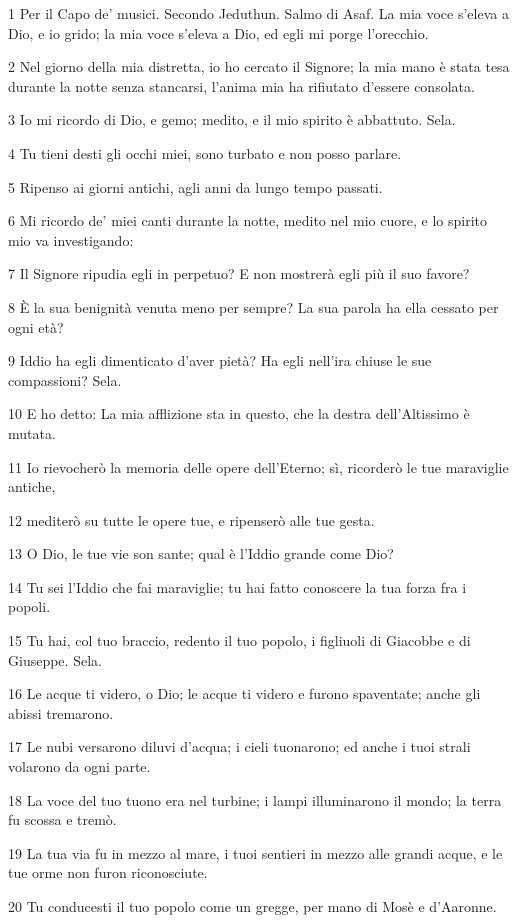 \par 1 Per il Capo de' musici. Secondo Jeduthun. Salmo di Asaf. La mia voce s'eleva a Dio, e io grido; la mia voce s'eleva a Dio, ed egli mi porge l'orecchio.
\par 2 Nel giorno della mia distretta, io ho cercato il Signore; la mia mano è stata tesa durante la notte senza stancarsi, l'anima mia ha rifiutato d'essere consolata.
\par 3 Io mi ricordo di Dio, e gemo; medito, e il mio spirito è abbattuto. Sela.
\par 4 Tu tieni desti gli occhi miei, sono turbato e non posso parlare.
\par 5 Ripenso ai giorni antichi, agli anni da lungo tempo passati.
\par 6 Mi ricordo de' miei canti durante la notte, medito nel mio cuore, e lo spirito mio va investigando:
\par 7 Il Signore ripudia egli in perpetuo? E non mostrerà egli più il suo favore?
\par 8 È la sua benignità venuta meno per sempre? La sua parola ha ella cessato per ogni età?
\par 9 Iddio ha egli dimenticato d'aver pietà? Ha egli nell'ira chiuse le sue compassioni? Sela.
\par 10 E ho detto: La mia afflizione sta in questo, che la destra dell'Altissimo è mutata.
\par 11 Io rievocherò la memoria delle opere dell'Eterno; sì, ricorderò le tue maraviglie antiche,
\par 12 mediterò su tutte le opere tue, e ripenserò alle tue gesta.
\par 13 O Dio, le tue vie son sante; qual è l'Iddio grande come Dio?
\par 14 Tu sei l'Iddio che fai maraviglie; tu hai fatto conoscere la tua forza fra i popoli.
\par 15 Tu hai, col tuo braccio, redento il tuo popolo, i figliuoli di Giacobbe e di Giuseppe. Sela.
\par 16 Le acque ti videro, o Dio; le acque ti videro e furono spaventate; anche gli abissi tremarono.
\par 17 Le nubi versarono diluvi d'acqua; i cieli tuonarono; ed anche i tuoi strali volarono da ogni parte.
\par 18 La voce del tuo tuono era nel turbine; i lampi illuminarono il mondo; la terra fu scossa e tremò.
\par 19 La tua via fu in mezzo al mare, i tuoi sentieri in mezzo alle grandi acque, e le tue orme non furon riconosciute.
\par 20 Tu conducesti il tuo popolo come un gregge, per mano di Mosè e d'Aaronne.

